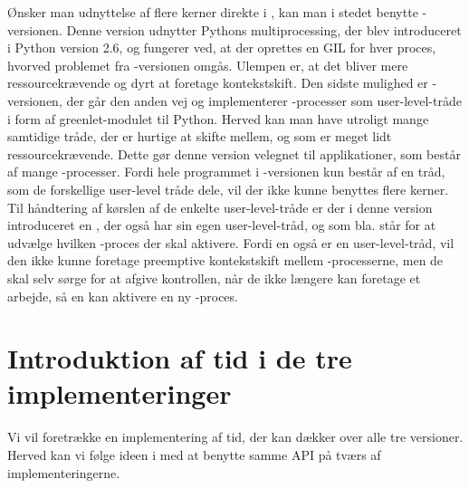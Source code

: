 Ønsker man udnyttelse af flere kerner direkte i \pycsp, kan man i stedet benytte -versionen. Denne version udnytter Pythons multiprocessing, der blev introduceret i Python version 2.6, og fungerer ved, at der oprettes en GIL for hver proces, hvorved problemet fra -versionen omgås. Ulempen er, at det bliver mere ressourcekrævende og dyrt at foretage kontekstskift.
Den sidste mulighed er -versionen, der går den anden vej og implementerer \csp-processer som user-level-tråde i form af greenlet-modulet til Python\cite{greenlet}. Herved kan man have utroligt mange samtidige tråde, der er hurtige at skifte mellem, og som er meget lidt ressourcekrævende. Dette gør denne version velegnet til applikationer, som består af mange \csp-processer. 
Fordi hele programmet i -versionen kun består af en tråd, som de forskellige user-level tråde dele, vil der ikke kunne benyttes flere kerner. Til håndtering af kørslen af de enkelte user-level-tråde er der i denne version introduceret en \sched, der også har sin egen user-level-tråd, og som bla. står for at udvælge hvilken \csp-proces der skal aktivere. Fordi \sched en også er en user-level-tråd, vil den ikke kunne foretage preemptive kontekstskift mellem \csp-processerne, men de skal selv sørge for at afgive kontrollen, når de ikke længere kan foretage et arbejde, så \sched en kan aktivere en ny \csp-proces.


\section{Introduktion af tid i de tre implementeringer}
Vi vil foretrække en implementering af tid, der kan dækker over alle tre versioner. Herved kan vi følge ideen i \pycsp med at benytte samme API på tværs af implementeringerne. 

